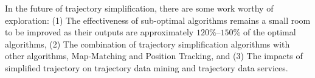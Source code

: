 In the future of trajectory simplification, there are some work worthy of exploration:
%
(1) The effectiveness of sub-optimal algorithms remains a small room to be improved as their outputs are approximately $120\%$--$150\%$ of the optimal algorithms, 
%
(2) The combination of trajectory simplification algorithms with other algorithms, \eg Map-Matching and Position Tracking, and 
(3) The impacts of simplified trajectory on trajectory data mining and trajectory data services.

